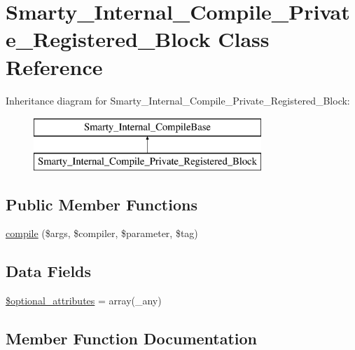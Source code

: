 \hypertarget{class_smarty___internal___compile___private___registered___block}{}\section{Smarty\+\_\+\+Internal\+\_\+\+Compile\+\_\+\+Private\+\_\+\+Registered\+\_\+\+Block Class Reference}
\label{class_smarty___internal___compile___private___registered___block}
Inheritance diagram for Smarty\+\_\+\+Internal\+\_\+\+Compile\+\_\+\+Private\+\_\+\+Registered\+\_\+\+Block\+:\begin{figure}[H]
\begin{center}
\leavevmode
\includegraphics[height=2.000000cm]{class_smarty___internal___compile___private___registered___block}
\end{center}
\end{figure}
\subsection*{Public Member Functions}
\begin{DoxyCompactItemize}
\item 
\hyperlink{class_smarty___internal___compile___private___registered___block_a140574a18ac861c95ce0def79d0223ae}{compile} (\$args, \$compiler, \$parameter, \$tag)
\end{DoxyCompactItemize}
\subsection*{Data Fields}
\begin{DoxyCompactItemize}
\item 
\hyperlink{class_smarty___internal___compile___private___registered___block_a899d1eb4a6fecbd6ce696adb171c80a4}{\$optional\+\_\+attributes} = array(\textquotesingle{}\+\_\+any\textquotesingle{})
\end{DoxyCompactItemize}


\subsection{Member Function Documentation}
\hypertarget{class_smarty___internal___compile___private___registered___block_a140574a18ac861c95ce0def79d0223ae}{}
